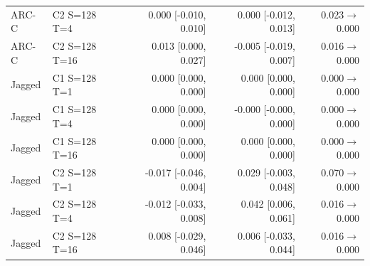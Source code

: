 \begin{table}[h!]
{\begin{tabular}{llrrr}
ARC-C & C2 S=128 T=4 & 0.000 [-0.010, 0.010] & 0.000 [-0.012, 0.013] & 0.023$\to$0.000 \\
ARC-C & C2 S=128 T=16 & 0.013 [0.000, 0.027] & -0.005 [-0.019, 0.007] & 0.016$\to$0.000 \\
Jagged & C1 S=128 T=1 & 0.000 [0.000, 0.000] & 0.000 [0.000, 0.000] & 0.000$\to$0.000 \\
Jagged & C1 S=128 T=4 & 0.000 [0.000, 0.000] & -0.000 [-0.000, 0.000] & 0.000$\to$0.000 \\
Jagged & C1 S=128 T=16 & 0.000 [0.000, 0.000] & 0.000 [0.000, 0.000] & 0.000$\to$0.000 \\
Jagged & C2 S=128 T=1 & -0.017 [-0.046, 0.004] & 0.029 [-0.003, 0.048] & 0.070$\to$0.000 \\
Jagged & C2 S=128 T=4 & -0.012 [-0.033, 0.008] & 0.042 [0.006, 0.061] & 0.016$\to$0.000 \\
Jagged & C2 S=128 T=16 & 0.008 [-0.029, 0.046] & 0.006 [-0.033, 0.044] & 0.016$\to$0.000 \\
\bottomrule
\end{tabular}}
\end{table}
